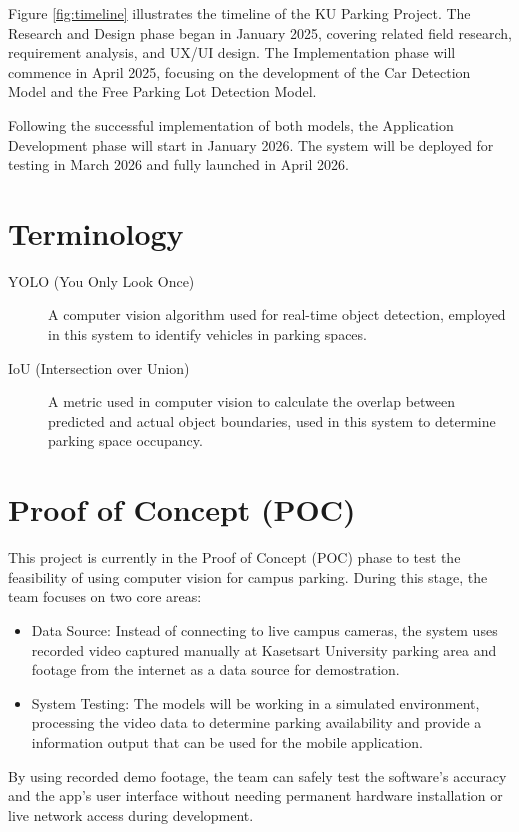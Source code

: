 Figure \ref{fig:timeline} illustrates the timeline of the KU Parking Project. The Research and Design phase began in January 2025, covering related field research, requirement analysis, and UX/UI design. The Implementation phase will commence in April 2025, focusing on the development of the Car Detection Model and the Free Parking Lot Detection Model.

Following the successful implementation of both models, the Application Development phase will start in January 2026. The system will be deployed for testing in March 2026 and fully launched in April 2026.

\section{Terminology}
\label{section:terminology}

\begin{description} 
    \item[YOLO (You Only Look Once)] A computer vision algorithm used for real-time object detection, employed in this system to identify vehicles in parking spaces.

    \item[IoU (Intersection over Union)] A metric used in computer vision to calculate the overlap between predicted and actual object boundaries, used in this system to determine parking space occupancy.   
\end{description}

\section{Proof of Concept (POC)}
\label{section:proof-of-concept}
This project is currently in the Proof of Concept (POC) phase to test the feasibility of using computer vision for campus parking. During this stage, the team focuses on two core areas:
\begin{itemize}
    \item Data Source: Instead of connecting to live campus cameras, the system uses recorded video  captured manually at Kasetsart University parking area and footage from the internet as a data source for demostration.
    
    \item System Testing: The models will be working in a simulated environment, processing the video data to determine parking availability and provide a information output that can be used for the mobile application.
\end{itemize}

By using recorded demo footage, the team can safely test the software's accuracy and the app's user interface without needing permanent hardware installation or live network access during development.